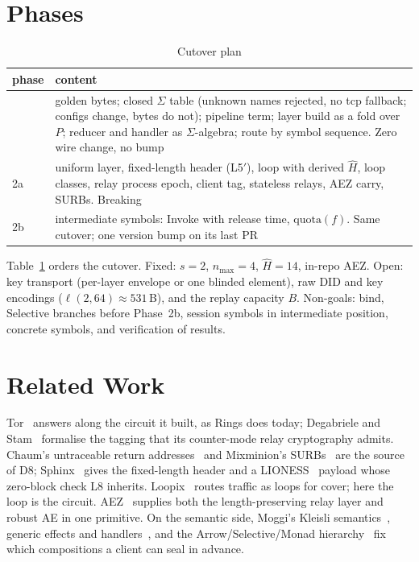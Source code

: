 \documentclass[journal]{IEEEtran}
\newcommand{\quota}{\mathrm{quota}}
\newcommand{\Hm}{\hat H}
\DeclareRobustCommand{\code}[1]{{\ttfamily\renewcommand{\_}{\textunderscore\allowbreak}#1}}
\begin{document}
\section{Phases}\label{sec:phases}

\begin{table}[t]
\caption{Cutover plan}
\label{tab:phases}
\centering\small
\begin{tabular}{@{}>{\raggedright\arraybackslash}p{}>{\raggedright\arraybackslash}p{}@{}}
\toprule
phase & content \\
\midrule
1 & golden bytes; closed $\Sigma$ table (unknown names rejected, no \code{tcp} fallback; configs change, bytes do not); pipeline term; layer build as a fold over $P$; reducer and handler as $\Sigma$-algebra; route by symbol sequence.  Zero wire change, no bump \\
2a & uniform layer, fixed-length header (L5$'$), loop with derived $\Hm$, loop classes, relay process epoch, client tag, stateless relays, AEZ carry, SURBs.  Breaking \\
2b & intermediate symbols: \code{Invoke} with release time, $\quota(f)$.  Same cutover; one version bump on its last PR \\
\bottomrule
\end{tabular}
\end{table}

Table~\ref{tab:phases} orders the cutover.  Fixed: $s=2$, $n_{\max}=4$,
$\Hm=14$, in-repo AEZ.  Open: key transport (per-layer envelope or one
blinded element), raw DID and key encodings ($\ell(2,64)\approx531$\,B),
and the replay capacity $B$.
Non-goals: bind, Selective branches before Phase~2b, session symbols in intermediate position, concrete symbols, and
verification of results.

\section{Related Work}\label{sec:related}

Tor~\cite{Dingledine2004} answers along the circuit it built, as Rings does
today; Degabriele and Stam~\cite{Degabriele2018} formalise the tagging that
its counter-mode relay cryptography admits.  Chaum's untraceable return
addresses~\cite{Chaum1981} and Mixminion's SURBs~\cite{Danezis2003} are the
source of D8; Sphinx~\cite{Danezis2009} gives the fixed-length header and a
LIONESS~\cite{Anderson1996} payload whose zero-block check L8 inherits.
Loopix~\cite{Piotrowska2017} routes traffic as loops for cover; here the
loop is the circuit.  AEZ~\cite{Hoang2015,AEZv5} supplies both the
length-preserving relay layer and robust AE in one primitive.  On the
semantic side, Moggi's Kleisli semantics~\cite{Moggi1991}, generic effects
and handlers~\cite{Plotkin2003,Plotkin2009}, and the
Arrow/Selective/Monad hierarchy~\cite{Hughes2000,Lindley2011,Mokhov2019}
fix which compositions a client can seal in advance.



\end{document}
